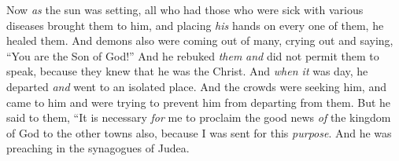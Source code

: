 \begin{biblechapter}
\verse Now \textit{as} the sun was setting, all who had those who were sick with various diseases brought them to him, and placing \textit{his} hands on every one of them, he healed them.
\verse And demons also were coming out of many, crying out and saying, “You are the Son of God!” And he rebuked \textit{them} \textit{and} did not permit them to speak, because they knew that he was the Christ.
\verse And \textit{when it} was day, he departed \textit{and} went to an isolated place. And the crowds were seeking him, and came to him and were trying to prevent him from departing from them.
\verse But he said to them, “It is necessary \textit{for} me to proclaim the good news \textit{of} the kingdom of God to the other towns also, because I was sent for this \textit{purpose}.
\verse And he was preaching in the synagogues of Judea.
\end{biblechapter}

